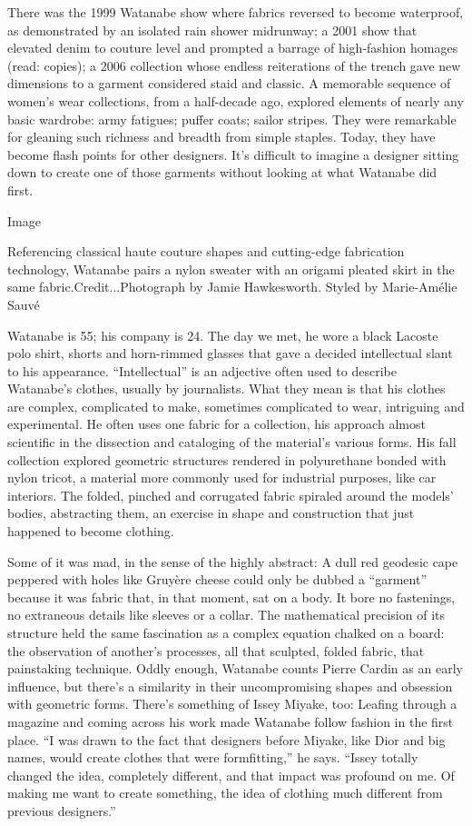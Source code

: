 There was the 1999 Watanabe show where fabrics reversed to become
waterproof, as demonstrated by an isolated rain shower mid­runway; a
2001 show that elevated denim to couture level and prompted a barrage of
high­-fashion homages (read: copies); a 2006 collection whose endless
reiterations of the trench gave new dimensions to a garment considered
staid and classic. A memorable sequence of women's wear collections,
from a half-decade ago, explored elements of nearly any basic wardrobe:
army fatigues; puffer coats; sailor stripes. They were remarkable for
gleaning such richness and breadth from simple staples. Today, they have
become flash points for other designers. It's difficult to imagine a
designer sitting down to create one of those garments without looking at
what Watanabe did first.

Image

Referencing classical haute couture shapes and cutting-edge fabrication
technology, Watanabe pairs a nylon sweater with an origami pleated skirt
in the same fabric.Credit...Photograph by Jamie Hawkesworth. Styled by
Marie-Amélie Sauvé

Watanabe is 55; his company is 24. The day we met, he wore a black
Lacoste polo shirt, shorts and horn­-rimmed glasses that gave a decided
intellectual slant to his appearance. ``Intellectual'' is an adjective
often used to describe Watanabe's clothes, usually by journalists. What
they mean is that his clothes are complex, complicated to make,
sometimes complicated to wear, intriguing and experimental. He often
uses one fabric for a collection, his approach almost scientific in the
dissection and cataloging of the material's various forms. His fall
collection explored geometric structures rendered in polyurethane bonded
with nylon tricot, a material more commonly used for industrial
purposes, like car interiors. The folded, pinched and corrugated fabric
spiraled around the models' bodies, abstracting them, an exercise in
shape and construction that just happened to become clothing.

Some of it was mad, in the sense of the highly abstract: A dull red
geodesic cape peppered with holes like Gruyère cheese could only be
dubbed a ``garment'' because it was fabric that, in that moment, sat on
a body. It bore no fastenings, no extraneous details like sleeves or a
collar. The mathematical precision of its structure held the same
fascination as a complex equation chalked on a board: the observation of
another's processes, all that sculpted, folded fabric, that painstaking
technique. Oddly enough, Watanabe counts Pierre Cardin as an early
influence, but there's a similarity in their uncompromising shapes and
obsession with geometric forms. There's something of Issey Miyake, too:
Leafing through a magazine and coming across his work made Watanabe
follow fashion in the first place. ``I was drawn to the fact that
designers before Miyake, like Dior and big names, would create clothes
that were form­fitting,'' he says. ``Issey totally changed the idea,
completely different, and that impact was profound on me. Of making me
want to create something, the idea of clothing much different from
previous designers.''

